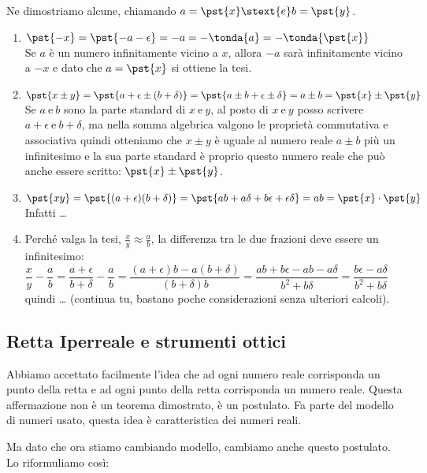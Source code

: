 Ne dimostriamo alcune, chiamando \quad  \(a=\pst{x} \stext{ e } b=\pst{y}\).
\begin{enumerate}%
 \item \(\pst{-x}=\pst{-a -\epsilon}=-a=-\tonda{a}=-\tonda{\pst{x}}\)\\
Se \(a\) è un numero infinitamente vicino a \(x\), allora \(-a\) sarà 
infinitamente vicino a \(-x\) e dato che \(a=\pst{x}\) si ottiene la tesi.
 \item \(\pst{x \pm y} = \pst{a+\epsilon \pm (b+\delta)}= 
         \pst{a\pm b+\epsilon \pm \delta}= a\pm b = \pst{x}\pm\pst{y}\)\\
Se \(a ~ \text{e} ~ b\) sono la parte standard di \(x ~ \text{e} ~ y\),
al posto di \(x ~ \text{e} ~ y\) posso scrivere 
\(a+\epsilon ~ \text{e} ~ b+\delta\), ma nella somma algebrica valgono le 
proprietà commutativa e associativa quindi otteniamo che \(x \pm y\) è 
uguale al numero reale \(a \pm b\) più un infinitesimo e la sua parte 
standard è proprio questo numero reale che può anche essere scritto:
\(\pst{x}\pm\pst{y}\).
 \item\(\pst{xy} = \pst{(a+\epsilon)(b+\delta)}=
        \pst{ab+a\delta+b\epsilon+\epsilon\delta}=ab=
        \pst{x} \cdot \pst{y}\) \\
Infatti \dots
 \item Perché valga la tesi, \(\frac{x}{y} \approx \frac{a}{b}\), la 
differenza tra le due frazioni deve essere un infinitesimo:\\
\(\dfrac{x}{y}- \dfrac{a}{b}=\dfrac{a+\epsilon}{b+\delta}-\dfrac{a}{b}=
  \dfrac{(a+\epsilon)b-a(b+\delta)}{(b+\delta)b}=
  \dfrac{ab+b\epsilon-ab-a\delta}{b^2+b\delta}=
  \dfrac{b\epsilon-a\delta}{b^2+b\delta}\)\\ quindi \dots
(continua tu, bastano poche considerazioni senza ulteriori calcoli).
\end{enumerate}

\subsection{Retta Iperreale e strumenti ottici}
\label{subsec:insnum_retta}

Abbiamo accettato facilmente l'idea che 
ad ogni numero reale corrisponda un punto della retta e ad ogni 
punto della retta corrisponda un numero reale. 
Questa affermazione non è un teorema dimostrato, è un postulato. 
Fa parte del modello di numeri usato, questa idea è caratteristica dei 
numeri reali. 

Ma dato che ora stiamo cambiando modello, cambiamo anche questo postulato. 
Lo riformuliamo così:


